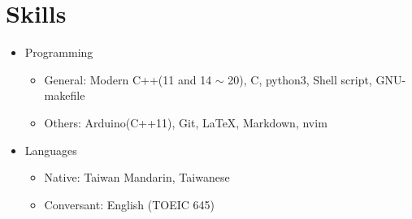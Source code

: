\section{Skills}
\begin{itemize}
	\item Programming
	\begin{itemize}
		\item General: Modern C++(11 and 14 $\sim$ 20), C, python3, Shell script, GNU-makefile
		\item Others: Arduino(C++11), Git, \LaTeX , Markdown, nvim
	\end{itemize}
	\item Languages
	\begin{itemize}
		\item Native: Taiwan Mandarin, Taiwanese
		\item Conversant: English (TOEIC 645)
	\end{itemize}
\end{itemize}